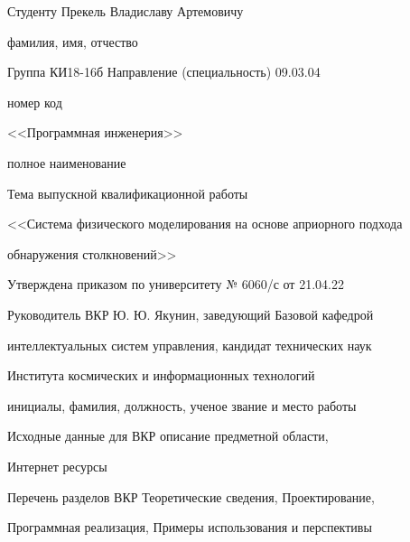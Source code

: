 \begin{spacing}{1}{
        \setlength{\parindent}{0cm}

        Студенту {\hfill Прекель Владиславу Артемовичу \hfill}

        \vspace{-4pt}
        {\footnotesize\hfill фамилия, имя, отчество \hfill}

        Группа {\hfill КИ18-16б \hfill} Направление (специальность) {\hfill\hfill 09.03.04 \hfill\hfill}

        \vspace{-4pt}
        {\footnotesize {\normalsize\hspace{8ex}} \hfill номер \hfill {\normalsize\hspace{32ex}} \hfill\hfill код \hfill\hfill}

        {\hfill <<Программная инженерия>> \hfill}

        \vspace{-4pt}
        {\footnotesize  \hfill полное наименование \hfill}

        Тема выпускной квалификационной работы {\hfill}

        {\hfill<<Система физического моделирования на основе априорного подхода\hfill}

        {\hfill обнаружения столкновений>>\hfill}

        Утверждена приказом по университету № {\hfill6060/с\hfill} от {\hfill\hfill\hfill21.04.22\hfill\hfill\hfill}

        Руководитель ВКР {\hfill Ю. Ю. Якунин, заведующий Базовой кафедрой \hfill}

        {\hfill интеллектуальных систем управления, кандидат технических наук \hfill}

        {\hfill Института космических и информационных технологий \hfill}

        \vspace{-4pt}
        {\footnotesize \hfill инициалы, фамилия, должность, ученое звание и место работы \hfill}

        Исходные данные для ВКР {описание предметной области,\hfill}

        {Интернет ресурсы\hfill}

        {\hfill}

        Перечень разделов ВКР {Теоретические сведения, Проектирование, \hfill}

        {Программная реализация, Примеры использования и перспективы \hfill}

}
\end{spacing}
